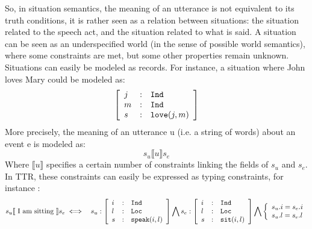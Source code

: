\documentclass[11pt]{article}
\newenvironment{recenv}
{\left[\begin{array}{lll}}
{\end{array}\right]}
\begin{document}
			So, in situation semantics, the meaning of an utterance is not equivalent to its truth conditions, it is rather seen as a relation between situations: the situation related to the speech act, and the situation related to what is said. A situation can be seen as an underspecified world (in the sense of possible world semantics), where some constraints are met, but some other properties remain unknown. Situations can easily be modeled as records. For instance, a situation where John loves Mary could be modeled as:
			\begin{equation*}
				\begin{recenv}
					j &:& \texttt{Ind} \\
					m &:& \texttt{Ind} \\
					s &:& \texttt{love}(j, m)
				\end{recenv}
			\end{equation*}
			More precisely, the meaning of an utterance u (i.e. a string of words) about an event e is modeled as:
			\begin{equation*}
			 s_u \llbracket u \rrbracket s_e
			\end{equation*}
			Where $\llbracket u \rrbracket$ specifies a certain number of constraints linking the fields of $s_u$ and $s_e$. In TTR, these constraints can easily be expressed as typing constraints, for instance \cite{barwise1998}:
			\begin{eqnarray*}
				s_u \llbracket\mbox{ I am sitting } \rrbracket s_e
				&\iff&
				s_u : \begin{recenv}
					i &:& \texttt{Ind} \\
					l &:& \texttt{Loc}\\
					s &:& \texttt{speak}(i, l)
				\end{recenv} \bigwedge
				s_e : \begin{recenv}
					i &:& \texttt{Ind} \\
					l &:& \texttt{Loc}\\
					s &:& \texttt{sit}(i, l)
				\end{recenv}
				\bigwedge					
				\left\lbrace\begin{array}{l}
				s_u.i = s_e.i\\
				s_u.l = s_e.l
				\end{array}\right.
			\end{eqnarray*}
			
			
\end{document}
